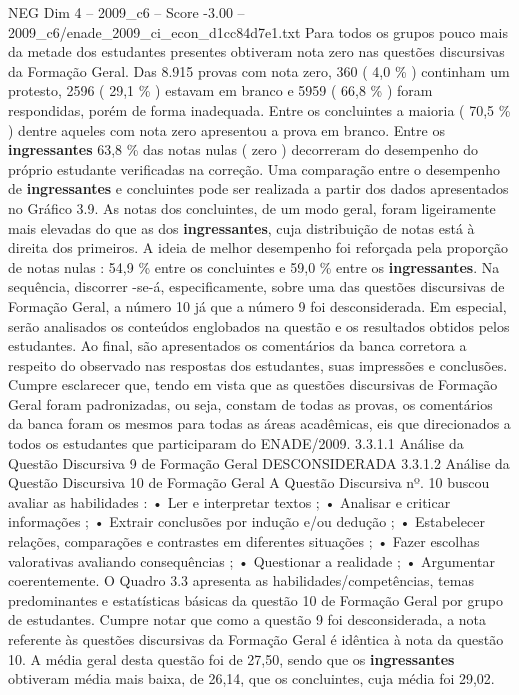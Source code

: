 \begin{textsample}{NEG Dim 4 – 2009\_c6 – Score -3.00 – 2009\_c6/enade\_2009\_ci\_econ\_d1cc84d7e1.txt}
Para todos os grupos pouco mais da metade dos estudantes presentes obtiveram nota zero nas questões discursivas da Formação Geral.
Das 8.915 provas com nota zero, 360 ( 4,0 \% ) continham um protesto, 2596 ( 29,1 \% ) estavam em branco e 5959 ( 66,8 \% ) foram respondidas, porém de forma inadequada.
Entre os concluintes a maioria ( 70,5 \% ) dentre aqueles com nota zero apresentou a prova em branco.
Entre os \textbf{ingressantes} 63,8 \% das notas nulas ( zero ) decorreram do desempenho do próprio estudante verificadas na correção.
Uma comparação entre o desempenho de \textbf{ingressantes} e concluintes pode ser realizada a partir dos dados apresentados no Gráfico 3.9.
As notas dos concluintes, de um modo geral, foram ligeiramente mais elevadas do que as dos \textbf{ingressantes}, cuja distribuição de notas está à direita dos primeiros.
A ideia de melhor desempenho foi reforçada pela proporção de notas nulas : 54,9 \% entre os concluintes e 59,0 \% entre os \textbf{ingressantes}.
Na sequência, discorrer -se-á, especificamente, sobre uma das questões discursivas de Formação Geral, a número 10 já que a número 9 foi desconsiderada.
Em especial, serão analisados os conteúdos englobados na questão e os resultados obtidos pelos estudantes.
Ao final, são apresentados os comentários da banca corretora a respeito do observado nas respostas dos estudantes, suas impressões e conclusões.
Cumpre esclarecer que, tendo em vista que as questões discursivas de Formação Geral foram padronizadas, ou seja, constam de todas as provas, os comentários da banca foram os mesmos para todas as áreas acadêmicas, eis que direcionados a todos os estudantes que participaram do ENADE/2009. 3.3.1.1 Análise da Questão Discursiva 9 de Formação Geral DESCONSIDERADA 3.3.1.2 Análise da Questão Discursiva 10 de Formação Geral A Questão Discursiva nº. 10 buscou avaliar as habilidades : • Ler e interpretar textos ; • Analisar e criticar informações ; • Extrair conclusões por indução e/ou dedução ; • Estabelecer relações, comparações e contrastes em diferentes situações ; • Fazer escolhas valorativas avaliando consequências ; • Questionar a realidade ; • Argumentar coerentemente.
O Quadro 3.3 apresenta as habilidades/competências, temas predominantes e estatísticas básicas da questão 10 de Formação Geral por grupo de estudantes.
Cumpre notar que como a questão 9 foi desconsiderada, a nota referente às questões discursivas da Formação Geral é idêntica à nota da questão 10.
A média geral desta questão foi de 27,50, sendo que os \textbf{ingressantes} obtiveram média mais baixa, de 26,14, que os concluintes, cuja média foi 29,02.

\end{textsample}
